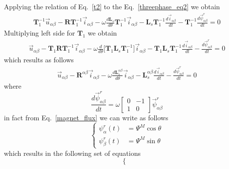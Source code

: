 \documentclass[12pt,a4paper,oneside]{book}
\begin{document}
\begin{onehalfspace}
\begin{figure}[H]
\end{figure}
Applying the relation of Eq.~\ref{t2} to the Eq.~\ref{threephase_eq2} we obtain
\begin{equation*}
	\begin{aligned}
		\mathbf{T}_1^{-1}\vec{u}_{\alpha\beta}-\mathbf{R}\mathbf{T}_1^{-1} 
		\vec{i}_{\alpha\beta}-\omega\frac{d\mathbf{L}_s}{d\theta} 
		\mathbf{T}_1^{-1}\vec{i}_{\alpha\beta}-\mathbf{L}_s \mathbf{T}_1^{-1} 
		\frac{d\vec{i}_{\alpha\beta}}{dt} -\mathbf{T}_1^{-1} 
		\frac{d\vec{\psi}^r_{\alpha\beta}}{dt} = 0
	\end{aligned} 
\end{equation*}
Multiplying left side for $\mathbf{T}_1$ we obtain
\begin{equation*}
	\begin{aligned}
		\vec{u}_{\alpha\beta}-\mathbf{T}_1\mathbf{R}\mathbf{T}_1^{-1}\vec{i}_{\alpha\beta}-\omega\frac{d}{d\theta}\Big[\mathbf{T}_1\mathbf{L}_s\mathbf{T}_1^{-1}\Big]\vec{i}_{\alpha\beta}-\mathbf{T}_1\mathbf{L}_s\mathbf{T}_1^{-1}\frac{d\vec{i}_{\alpha\beta}}{dt}-\frac{d\vec{\psi}^r_{\alpha\beta}}{dt}
		= 0
	\end{aligned} 
\end{equation*}
which results as follows
\begin{equation}
	\begin{aligned}
		\vec{u}_{\alpha\beta}-\mathbf{R}^{\alpha\beta}\vec{i}_{\alpha\beta}-\omega\frac{d\mathbf{L}_s^{\alpha\beta}}{d\theta}\vec{i}_{\alpha\beta}-\mathbf{L}_s^{\alpha\beta}\frac{d\vec{i}_{\alpha\beta}}{dt}-\frac{d\vec{\psi}^r_{\alpha\beta}}{dt}
		= 0
	\end{aligned} 
\end{equation}
where $$\frac{d\vec{\psi}^r_{\alpha\beta}}{dt} = \omega \begin{bmatrix} 0 & -1 
	\\ 1 & 0\end{bmatrix} \vec{\psi}^r_{\alpha\beta}$$
in fact from Eq.~\ref{magnet_flux} we can write as follows
\begin{equation}\label{magnet_flux_ab}
	\left\lbrace \begin{aligned}
		\psi_\alpha^r(t) &= \Psi^M\cos\theta \\[6pt]
		\psi_\beta^r(t) &= \Psi^M\sin\theta
	\end{aligned} \right. 
\end{equation}
which results in the following set of equations
\begin{equation}\label{twophase_eq1}
	\left\lbrace \begin{aligned}

\end{aligned}
\end{equation}
\end{onehalfspace}
\end{document}
